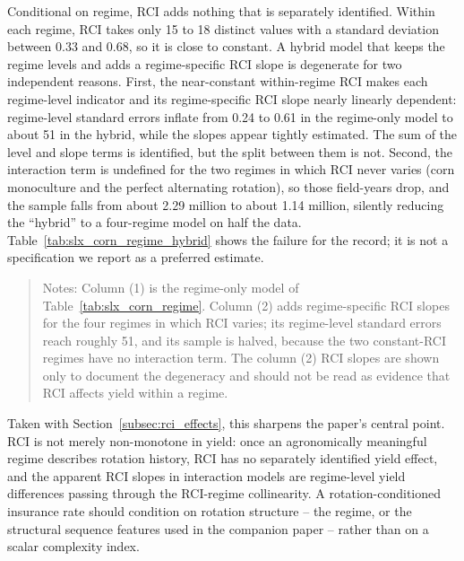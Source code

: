 \documentclass[12pt,letterpaper]{article}
\theoremstyle{remark}
\theoremstyle{remark}
\let\oldtable\table
\let\endoldtable\endtable
\renewenvironment{table}[1][H]{\oldtable[H]}{\endoldtable}
\theoremstyle{plain}
\theoremstyle{definition}
\begin{document}
Conditional on regime, RCI adds nothing that is separately identified. Within each regime, RCI takes only 15 to 18 distinct values with a standard deviation between 0.33 and 0.68, so it is close to constant. A hybrid model that keeps the regime levels and adds a regime-specific RCI slope is degenerate for two independent reasons. First, the near-constant within-regime RCI makes each regime-level indicator and its regime-specific RCI slope nearly linearly dependent: regime-level standard errors inflate from 0.24 to 0.61 in the regime-only model to about 51 in the hybrid, while the slopes appear tightly estimated. The sum of the level and slope terms is identified, but the split between them is not. Second, the interaction term is undefined for the two regimes in which RCI never varies (corn monoculture and the perfect alternating rotation), so those field-years drop, and the sample falls from about 2.29 million to about 1.14 million, silently reducing the ``hybrid'' to a four-regime model on half the data. Table~\ref{tab:slx_corn_regime_hybrid} shows the failure for the record; it is not a specification we report as a preferred estimate.

\begin{table}[H]
  \centering
  \caption{Regime-only versus hybrid regime-plus-RCI-slope model.}
  \label{tab:slx_corn_regime_hybrid}
  
\end{table}
\begin{quote}
\small
Notes: Column (1) is the regime-only model of Table~\ref{tab:slx_corn_regime}.
Column (2) adds regime-specific RCI slopes for the four regimes in which RCI
varies; its regime-level standard errors reach roughly 51, and its sample is
halved, because the two constant-RCI regimes have no interaction term. The column
(2) RCI slopes are shown only to document the degeneracy and should not be read
as evidence that RCI affects yield within a regime.
\end{quote}

Taken with Section~\ref{subsec:rci_effects}, this sharpens the paper's central point. RCI is not merely non-monotone in yield: once an agronomically meaningful regime describes rotation history, RCI has no separately identified yield effect, and the apparent RCI slopes in interaction models are regime-level yield differences passing through the RCI-regime collinearity. A rotation-conditioned insurance rate should condition on rotation structure -- the regime, or the structural sequence features used in the companion paper -- rather than on a scalar complexity index.
\end{document}
